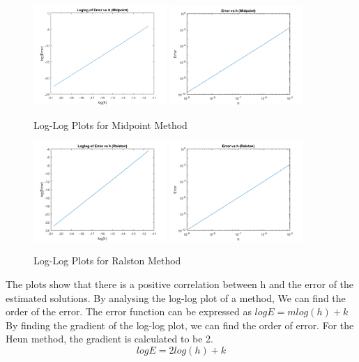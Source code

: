 \documentclass[11pt, oneside, titlepage]{article}   	%
\begin{document}
\begin{figure}[H]
\center
\includegraphics[width = 0.45\textwidth]{exercise2_5}
\includegraphics[width = 0.45\textwidth]{exercise2_5a}
\caption{Log-Log Plots for Midpoint Method} 
\end{figure}

\begin{figure}[H]
\center
\includegraphics[width = 0.45\textwidth]{exercise2_6a}
\includegraphics[width = 0.45\textwidth]{exercise2_6}
\caption{Log-Log Plots for Ralston Method}
\end{figure}

The plots show that there is a positive correlation between h and the error of the estimated solutions. By analysing the log-log plot of a method, We can find the order of the error.
The error function can be expressed as $log E = m log(h)+k$ 
By finding the gradient of the log-log plot, we can find the order of error. For the Heun method, the gradient is calculated to be 2.
\begin{equation}
log E=2log (h) + k
\end{equation}
\end{document}
